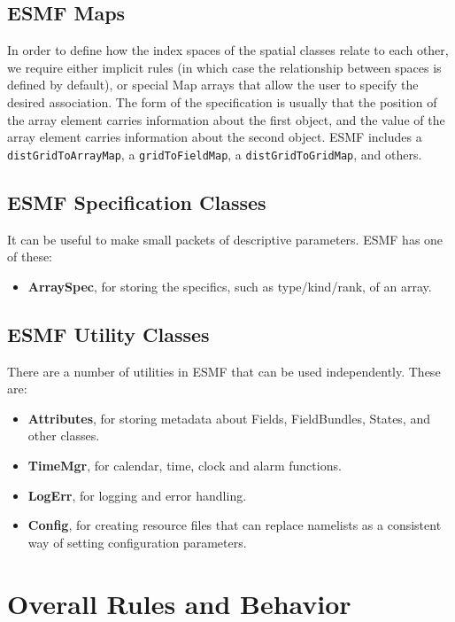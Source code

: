 \subsection{ESMF Maps}

In order to define how the index spaces of the spatial classes relate
to each other, we require either implicit rules (in which case the
relationship between spaces is defined by default), or special Map arrays
that allow the user to specify the desired association.  The form of the 
specification is usually that the position of the array element carries
information about the first object, and the value of the array element carries
information about the second object.  ESMF includes a {\tt distGridToArrayMap},
a {\tt gridToFieldMap}, a {\tt distGridToGridMap}, and others.

\subsection{ESMF Specification Classes}

It can be useful to make small packets
of descriptive parameters.  ESMF has one of these:
\begin{itemize}
\item {\bf ArraySpec}, for storing the specifics, such as type/kind/rank,
of an array.
\end{itemize}

\subsection{ESMF Utility Classes}

There are a number of utilities in ESMF that can be used independently.
These are:
\begin{itemize}
\item {\bf Attributes}, for storing metadata about Fields,
FieldBundles, States, and other classes.
\item {\bf TimeMgr}, for calendar, time, clock and alarm functions.
\item {\bf LogErr}, for logging and error handling.
\item {\bf Config}, for creating resource files that can replace namelists
as a consistent way of setting configuration parameters.
\end{itemize}

\section{Overall Rules and Behavior}


